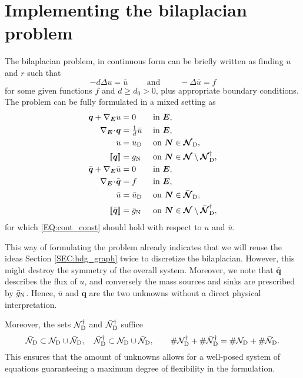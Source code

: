\documentclass[a4paper, english, 12pt, reqno, draft]{amsart}
\theoremstyle{definition}
\theoremstyle{remark}
\numberwithin{equation}{section}
\newcommand{\setNode}{\ensuremath{\mathcal N}}
\newcommand{\setNodeDir}{\ensuremath{\setNode_\textup D}}
\newcommand{\setNodeBar}{\ensuremath{\bar{\mathcal N}}}
\newcommand{\setNodeDirBar}{\ensuremath{\setNodeBar_\textup D}}
\newcommand{\SetNode}{\ensuremath{\boldsymbol{\mathcal N}}}
\newcommand{\SetNodeDir}{\ensuremath{\SetNode_\textup D}}
\newcommand{\SetNodeBar}{\ensuremath{\bar{\boldsymbol{\mathcal N}}}}
\newcommand{\SetNodeDirBar}{\ensuremath{\SetNodeBar_\textup D}}
\newcommand{\Edge}{{\ensuremath{\boldsymbol E}}}
\newcommand{\Node}{{\ensuremath{\boldsymbol N}}}
\newcommand{\Nabla}{\ensuremath{\nabla_\Edge}}
\newcommand{\Div}{\ensuremath{\Nabla\!\cdot\!}}
\newcommand{\jump}[1]{{[\![ #1 ]\!]}}
\renewcommand{\vec}[1]{\ensuremath{\boldsymbol{#1}}}
\begin{document}
\section{Implementing the bilaplacian problem}\label{SEC:bilaplacian}
% 
The bilaplacian problem, in continuous form can be briefly written as finding $u$ and $r$ such that
% 
\begin{equation*}
 -d \Delta u = \bar u \qquad \text{ and } \qquad -\Delta \bar u = f
\end{equation*}
% 
for some given functions $f$ and $d \ge d_0 > 0$, plus appropriate boundary conditions. The problem can be fully formulated in a mixed setting as
% 
\begin{subequations}\label{EQ:bilap}
\begin{align}
 \vec q + \Nabla u & = 0 && \text{ in } \Edge,\\
 \Div \vec q & = \tfrac{1}{d} \bar u && \text{ in } \Edge,\\
 u & = u_\textup D && \text{ on } \Node \in \SetNodeDir,\\
 \jump{\vec q} & = g_\textup N && \text{ on } \Node \in \SetNode \setminus \SetNodeDir^\dagger,\\
 \bar{\vec q} + \Nabla \bar u & = 0 && \text{ in } \Edge,\\
 \Div \bar{\vec q} & = f && \text{ in } \Edge,\label{EQ:bilap_f}\\
 \bar u & = \bar u_\textup D && \text{ on } \Node \in \SetNodeDirBar,\\
 \jump{\bar{\vec q}} & = \bar g_\textup N && \text{ on } \Node \in \SetNode \setminus \SetNodeDirBar^\dagger,
\end{align}
\end{subequations}
% 
for which \eqref{EQ:cont_const} should hold with respect to $u$ and $\bar u$.

This way of formulating the problem already indicates that we will reuse the ideas Section \ref{SEC:hdg_graph} twice to discretize the bilaplacian. However, this might destroy the symmetry of the overall system. Moreover, we note that $\bar{\vec q}$ describes the flux of $u$, and conversely the mass sources and sinks are prescribed by $\bar g_\textup N$. Hence, $\bar u$ and $\vec q$ are the two unknowns without a direct physical interpretation. 

Moreover, the sets $\setNodeDir^\dagger$ and $\setNodeDirBar^\dagger$ suffice
% 
\begin{equation}
 \setNodeDirBar \subset \setNodeDir \cup \setNodeDirBar, \quad \setNodeDirBar^\dagger \subset \setNodeDir \cup \setNodeDirBar, \qquad \# \setNodeDir^\dagger + \# \setNodeDirBar^\dagger = \# \setNodeDir + \# \setNodeDirBar.
\end{equation}
% 
This ensures that the amount of unknowns allows for a well-posed system of equations guaranteeing a maximum degree of flexibility in the formulation.
% 
\end{document}
